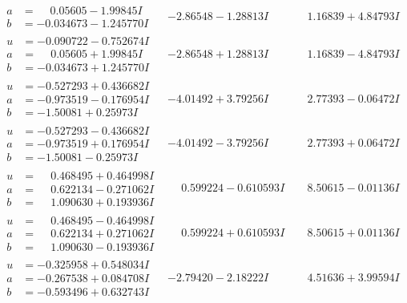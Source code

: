 \documentclass[1p]{elsarticle_modified}
\theoremstyle{definition}
\begin{document}
$$\begin{array}{c|c|c}
\begin{aligned}
a &= \phantom{-}0.05605 - 1.99845 I \\
b &= -0.034673 - 1.245770 I\end{aligned}
 & -2.86548 - 1.28813 I & \phantom{-}1.16839 + 4.84793 I \\ \hline\begin{aligned}
u &= -0.090722 - 0.752674 I \\
a &= \phantom{-}0.05605 + 1.99845 I \\
b &= -0.034673 + 1.245770 I\end{aligned}
 & -2.86548 + 1.28813 I & \phantom{-}1.16839 - 4.84793 I \\ \hline\begin{aligned}
u &= -0.527293 + 0.436682 I \\
a &= -0.973519 - 0.176954 I \\
b &= -1.50081 + 0.25973 I\end{aligned}
 & -4.01492 + 3.79256 I & \phantom{-}2.77393 - 0.06472 I \\ \hline\begin{aligned}
u &= -0.527293 - 0.436682 I \\
a &= -0.973519 + 0.176954 I \\
b &= -1.50081 - 0.25973 I\end{aligned}
 & -4.01492 - 3.79256 I & \phantom{-}2.77393 + 0.06472 I \\ \hline\begin{aligned}
u &= \phantom{-}0.468495 + 0.464998 I \\
a &= \phantom{-}0.622134 - 0.271062 I \\
b &= \phantom{-}1.090630 + 0.193936 I\end{aligned}
 & \phantom{-}0.599224 - 0.610593 I & \phantom{-}8.50615 - 0.01136 I \\ \hline\begin{aligned}
u &= \phantom{-}0.468495 - 0.464998 I \\
a &= \phantom{-}0.622134 + 0.271062 I \\
b &= \phantom{-}1.090630 - 0.193936 I\end{aligned}
 & \phantom{-}0.599224 + 0.610593 I & \phantom{-}8.50615 + 0.01136 I \\ \hline\begin{aligned}
u &= -0.325958 + 0.548034 I \\
a &= -0.267538 + 0.084708 I \\
b &= -0.593496 + 0.632743 I\end{aligned}
 & -2.79420 - 2.18222 I & \phantom{-}4.51636 + 3.99594 I \\ \hline\begin{aligned}

\end{aligned}
\end{array}$$
\end{document}
